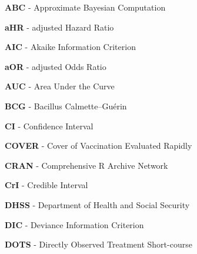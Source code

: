 \documentclass[11pt,twoside]{bristolthesis}
\begin{document}
      \listoffigures
      \begin{acronyms}
      \textbf{ABC} - Approximate Bayesian Computation
      
      \par
      
      \textbf{aHR} - adjusted Hazard Ratio
      
      \par
      
      \textbf{AIC} - Akaike Information Criterion
      
      \par
      
      \textbf{aOR} - adjusted Odds Ratio
      
      \par
      
      \textbf{AUC} - Area Under the Curve
      
      \par
      
      \textbf{BCG} - Bacillus Calmette--Guérin
      
      \par
      
      \textbf{CI} - Confidence Interval
      
      \par
      
      \textbf{COVER} - Cover of Vaccination Evaluated Rapidly
      
      \par
      
      \textbf{CRAN} - Comprehensive R Archive Network
      
      \par
      
      \textbf{CrI} - Credible Interval
      
      \par
      
      \textbf{DHSS} - Department of Health and Social Security
      
      \par
      
      \textbf{DIC} - Deviance Information Criterion
      
      \par
      
      \textbf{DOTS} - Directly Observed Treatment Short-course
      
      \par
      

\end{acronyms}
\end{document}
